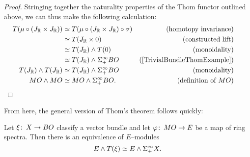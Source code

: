 \begin{proof}
Stringing together the naturality properties of the Thom functor outlined above, we can thus make the following calculation:
\begin{align*}
T(\mu \circ (J_{\R} \times J_{\R})) & \simeq T(\mu \circ (J_{\R} \times J_{\R}) \circ \sigma) & \text{(homotopy invariance)} \\
& \simeq T(J_{\R} \times 0) & \text{(constructed lift)} \\
& \simeq T(J_{\R}) \sm T(0) & \text{(monoidality)} \\
& \simeq T(J_{\R}) \sm \Susp^\infty_+ BO & \text{(\Cref{TrivialBundleThomExample})} \\
T(J_{\R}) \sm T(J_{\R}) & \simeq T(J_{\R}) \sm \Susp^\infty_+ BO & \text{(monoidality)} \\
MO \sm MO & \simeq MO \sm \Susp^\infty_+ BO. & \text{(definition of $MO$)} & \phantom{.} \qed
\end{align*}
\end{proof}

\noindent From here, the general version of Thom's theorem follows quickly:

\begin{theorem}
Let $\xi\colon\thinspace X \to BO$ classify a vector bundle and let $\varphi\colon\thinspace MO \to E$ be a map of ring spectra. Then there is an equivalence of $E$--modules \[E \wedge T(\xi) \simeq E \wedge \Sigma^\infty_+ X.\]
\end{theorem}

